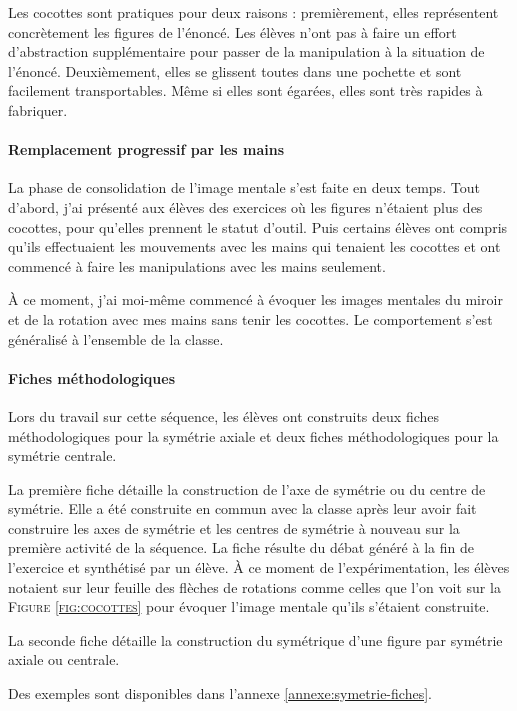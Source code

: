 Les cocottes sont pratiques pour deux raisons : premièrement, elles représentent concrètement les figures de l'énoncé. Les élèves n'ont pas à faire un effort d'abstraction supplémentaire pour passer de la manipulation à la situation de l'énoncé. Deuxièmement, elles se glissent toutes dans une pochette et sont facilement transportables. Même si elles sont égarées, elles sont très rapides à fabriquer.

\paragraph{Remplacement progressif par les mains}

La phase de consolidation de l'image mentale s'est faite en deux temps. Tout d'abord, j'ai présenté aux élèves des exercices où les figures n'étaient plus des cocottes, pour qu'elles prennent le statut d'outil. Puis certains élèves ont compris qu'ils effectuaient les mouvements avec les mains qui tenaient les cocottes et ont commencé à faire les manipulations avec les mains seulement.

À ce moment, j'ai moi-même commencé à évoquer les images mentales du miroir et de la rotation avec mes mains sans tenir les cocottes. Le comportement s'est généralisé à l'ensemble de la classe.

\paragraph{Fiches méthodologiques}

Lors du travail sur cette séquence, les élèves ont construits deux fiches méthodologiques pour la symétrie axiale et deux fiches méthodologiques pour la symétrie centrale.

La première fiche détaille la construction de l'axe de symétrie ou du centre de symétrie. Elle a été construite en commun avec la classe après leur avoir fait construire les axes de symétrie et les centres de symétrie à nouveau sur la première activité de la séquence. La fiche résulte du débat généré à la fin de l'exercice et synthétisé par un élève. À ce moment de l'expérimentation, les élèves notaient sur leur feuille des flèches de rotations comme celles que l'on voit sur la \textsc{Figure \ref{fig:cocottes}} pour évoquer l'image mentale qu'ils s'étaient construite.

La seconde fiche détaille la construction du symétrique d'une figure par symétrie axiale ou centrale.

Des exemples sont disponibles dans l'annexe \ref{annexe:symetrie-fiches}.

